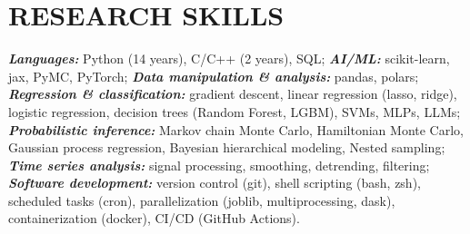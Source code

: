 \section{\large RESEARCH SKILLS}

\textbf{\textit{Languages:}} Python (14 years), C/C++ (2 years), SQL; \quad
\textbf{\textit{AI/ML:}} scikit-learn, jax, PyMC, PyTorch; \quad
\textbf{\textit{Data manipulation \& analysis:}} pandas, polars; \quad
\textbf{\textit{Regression \& classification:}} gradient descent, linear regression (lasso, ridge), logistic regression, decision trees (Random Forest, LGBM), SVMs, MLPs, LLMs; \quad
\textbf{\textit{Probabilistic inference:}} Markov chain Monte Carlo, Hamiltonian Monte Carlo, Gaussian process regression, Bayesian hierarchical modeling, Nested sampling; \quad
\textbf{\textit{Time series analysis:}} signal processing, smoothing, detrending, filtering; \quad
\textbf{\textit{Software development:}} version control (git), shell scripting (bash, zsh), scheduled tasks (cron), parallelization (joblib, multiprocessing, dask), containerization (docker), CI/CD (GitHub Actions).
